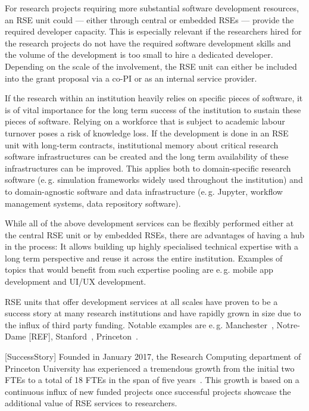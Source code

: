 \documentclass[a4paper]{article}
\makeatletter
\newcommand*{\eg}{e.\,g.\@\xspace}
\makeatother
\begin{document}
For research projects requiring more substantial software development resources, an RSE unit could --- either through central or embedded RSEs --- provide the required developer capacity.
This is especially relevant if the researchers hired for the research projects do not have the required software development skills and the volume of the development is too small to hire a dedicated developer.
Depending on the scale of the involvement, the RSE unit can either be included into the grant proposal via a co-PI or as an internal service provider.

If the research within an institution heavily relies on specific pieces of software,
it is of vital importance for the long term success of the institution to sustain these pieces of software.
Relying on a workforce that is subject to academic labour turnover poses a risk of knowledge loss.
If the development is done in an RSE unit with long-term contracts, institutional memory about critical research software infrastructures can be created and the long term availability of these infrastructures can be improved.
This applies both to domain-specific research software (\eg{} simulation frameworks widely used throughout the institution)
and to domain-agnostic software and data infrastructure (\eg{} Jupyter, workflow management systems, data repository software).

While all of the above development services can be flexibly performed either at the central RSE unit or by embedded RSEs, there are advantages of having a hub in the process:
It allows building up highly specialised technical expertise with a long term perspective and reuse it across the entire institution.
Examples of topics that would benefit from such expertise pooling are \eg{} mobile app development and UI/UX development.

RSE units that offer development services at all scales have proven to be a success story at many research institutions and have rapidly grown in size due to the influx of third party funding.
Notable examples are \eg{} Manchester~\autocite{Sinclair2022}, Notre-Dame [REF], Stanford~\autocite{Stanford2023}, Princeton~\autocite{Cosden2022a}.

[SuccessStory]
Founded in January 2017, the Research Computing department of Princeton University has experienced a tremendous growth from the initial two FTEs to a total of 18 FTEs in the span of five years~\autocite{Cosden2022a}.
This growth is based on a continuous influx of new funded projects once successful projects showcase the additional value of RSE services to researchers.
\end{document}
